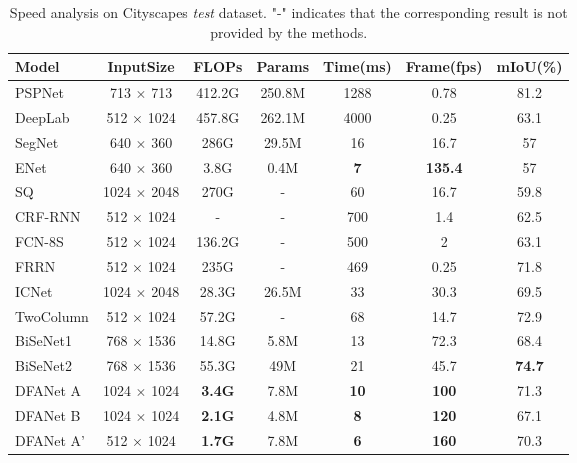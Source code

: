 \documentclass[10pt,twocolumn,letterpaper]{article}
\begin{document}
\begin{table*}
\begin{center}
\begin{tabular}{|l|c|c|c|c|c|c|}
\hline
Model                     & InputSize & FLOPs                  & Params & Time(ms) & Frame(fps) & mIoU(\%) \\
\hline\hline
PSPNet\cite{pspnet}      & 713 $\times$ 713    & 412.2G     & 250.8M     & 1288 & 0.78 & 81.2 \\
DeepLab\cite{DeepLab2}    & 512 $\times$ 1024  & 457.8G  & 262.1M     & 4000 & 0.25 & 63.1 \\
\hline
SegNet\cite{segnet}       & 640 $\times$ 360   & 286G    & 29.5M & 16   & 16.7 & 57   \\
ENet\cite{enet}           & 640 $\times$ 360   & 3.8G    & 0.4M  & \textbf{7}    & \textbf{135.4} & 57   \\
SQ\cite{SQ}               & 1024 $\times$ 2048 & 270G    & -     & 60   & 16.7 & 59.8 \\
CRF-RNN\cite{crfasRnn}    & 512 $\times$ 1024  & -       & -     & 700  & 1.4  & 62.5 \\
FCN-8S\cite{fcn_seg}      & 512 $\times$ 1024  & 136.2G  & -     & 500  & 2 & 63.1 \\
FRRN\cite{frrn}           & 512 $\times$ 1024  & 235G      & -     & 469  & 0.25 & 71.8 \\
ICNet\cite{ICNet}         & 1024 $\times$ 2048 & 28.3G   & 26.5M     & 33   & 30.3 & 69.5 \\
TwoColumn\cite{twocolumn} & 512 $\times$ 1024  & 57.2G   & -     & 68   & 14.7 & 72.9 \\
BiSeNet1\cite{BiSeNet}    & 768 $\times$ 1536  & 14.8G   & 5.8M  & 13   & 72.3 & 68.4 \\
BiSeNet2\cite{BiSeNet}    & 768 $\times$ 1536  & 55.3G   & 49M   & 21   & 45.7 & \textbf{74.7} \\
\hline
DFANet A                  & 1024 $\times$ 1024 & \textbf{3.4G}  & 7.8M & \textbf{10} & \textbf{100}  & 71.3 \\
DFANet B                  & 1024 $\times$ 1024 & \textbf{2.1G}  & 4.8M & \textbf{8} & \textbf{120}  & 67.1 \\
DFANet A'                 & 512 $\times$ 1024 & \textbf{1.7G}  & 7.8M & \textbf{6} & \textbf{160}  & 70.3 \\
\hline
\end{tabular}
\end{center}
\caption{Speed analysis on Cityscapes \textit{test} dataset. "-" indicates that the corresponding result is not provided by the methods.}
\label{tab:speed analysis}
\end{table*}
\end{document}
